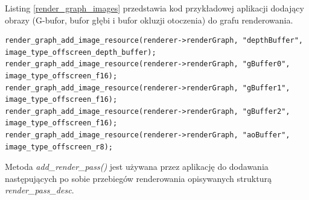 Listing \ref{render_graph_images} przedstawia kod przykładowej aplikacji dodający obrazy (G-bufor, bufor głębi i bufor okluzji otoczenia) do grafu renderowania.
\lstset{language=C}
\begin{lstlisting}[caption={Dodawanie obrazów do grafu renderowania przykładowej aplikacji},captionpos=b,label={render_graph_images}]
render_graph_add_image_resource(renderer->renderGraph, "depthBuffer",
image_type_offscreen_depth_buffer);
render_graph_add_image_resource(renderer->renderGraph, "gBuffer0", image_type_offscreen_f16);
render_graph_add_image_resource(renderer->renderGraph, "gBuffer1", image_type_offscreen_f16);
render_graph_add_image_resource(renderer->renderGraph, "gBuffer2", image_type_offscreen_f16);
render_graph_add_image_resource(renderer->renderGraph, "aoBuffer", image_type_offscreen_r8);
\end{lstlisting}

Metoda \textit{add\_render\_pass()} jest używana przez aplikację do dodawania następujących po sobie przebiegów renderowania opisywanych strukturą \textit{render\_pass\_desc}.

